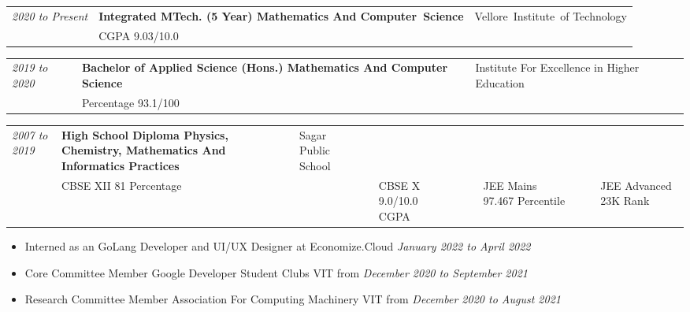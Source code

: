 \documentclass{myresume}
\begin{document}

        \begin{tabularx}{\textwidth}{ >{\hsize=0.25\hsize}X  >{\hsize=0.5\hsize}X >{\hsize=0.25\hsize}X }
                \textit{2020 to Present} & \textbf{Integrated MTech. (5 Year) Mathematics And \mbox{Computer Science} } & \mbox{Vellore Institute of} \mbox{Technology}\\
                & CGPA 9.03/10.0 & \\
        \end{tabularx}

        \begin{tabularx}{\textwidth}{ >{\hsize=0.25\hsize}X  >{\hsize=0.5\hsize}X >{\hsize=0.25\hsize}X }
            \textit{2019 to 2020} & \textbf{Bachelor of Applied Science (Hons.) {\hspace{1cm}} Mathematics And Computer Science} & Institute For Excellence in Higher Education\\
            & Percentage 93.1/100 & \\
        \end{tabularx} 
        
        \begin{tabularx}{\textwidth}{ >{\hsize}X  >{\hsize}X >{\hsize}X }
            \textit{2007 to 2019} & \textbf{High School Diploma Physics, Chemistry, Mathematics And Informatics Practices} & Sagar Public School\\
            & CBSE XII 81 Percentage & & & CBSE X 9.0/10.0 CGPA & & & JEE Mains 97.467 Percentile & & & JEE Advanced 23K Rank & \\ 
        \end{tabularx}
       
       
        \begin{itemize}
        		\item Interned as an GoLang Developer and UI/UX Designer at Economize.Cloud  \textit{January 2022 to April 2022}
                \item Core Committee Member  Google Developer Student Clubs  VIT from \textit{December 2020 to September 2021}
                \item Research Committee Member  Association For Computing Machinery  VIT from \textit{December 2020 to August 2021}
        \end{itemize}
\end{document}
